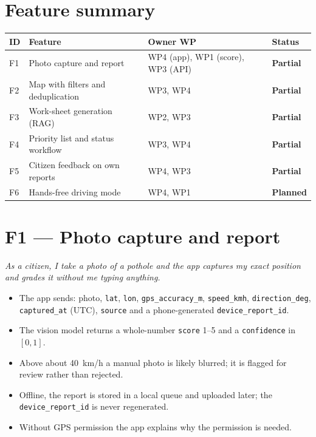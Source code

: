 \documentclass[11pt,a4paper,oneside]{report}
\newcommand{\sPart}{\textcolor{warnorange}{\textbf{Partial}}}
\newcommand{\sPlan}{\textcolor{planblue}{\textbf{Planned}}}
\begin{document}
\section{Feature summary}
\begin{longtable}{@{}L{1cm}L{6cm}L{5cm}L{2cm}@{}}
\toprule\textbf{ID} & \textbf{Feature} & \textbf{Owner WP} & \textbf{Status}\\\midrule\endhead
F1 & Photo capture and report & WP4 (app), WP1 (score), WP3 (API) & \sPart\\
F2 & Map with filters and deduplication & WP3, WP4 & \sPart\\
F3 & Work-sheet generation (RAG) & WP2, WP3 & \sPart\\
F4 & Priority list and status workflow & WP3, WP4 & \sPart\\
F5 & Citizen feedback on own reports & WP4, WP3 & \sPart\\
F6 & Hands-free driving mode & WP4, WP1 & \sPlan\\\bottomrule
\end{longtable}

\section{F1 --- Photo capture and report}
\textit{As a citizen, I take a photo of a pothole and the app captures my exact position and grades it
without me typing anything.}
\begin{itemize}
\item The app sends: photo, \texttt{lat}, \texttt{lon}, \texttt{gps\_accuracy\_m}, \texttt{speed\_kmh},
\texttt{direction\_deg}, \texttt{captured\_at} (UTC), \texttt{source} and a phone-generated \texttt{device\_report\_id}.
\item The vision model returns a whole-number \texttt{score} 1--5 and a \texttt{confidence} in $[0,1]$.
\item Above about 40~km/h a manual photo is likely blurred; it is flagged for review rather than rejected.
\item Offline, the report is stored in a local queue and uploaded later; the \texttt{device\_report\_id} is never regenerated.
\item Without GPS permission the app explains why the permission is needed.
\end{itemize}
\end{document}
